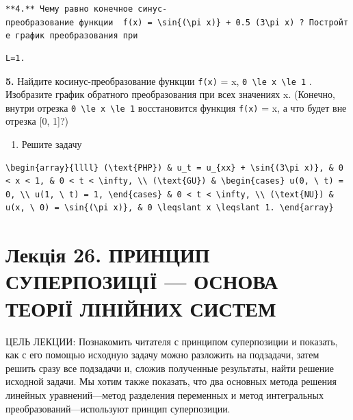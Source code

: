 \documentclass[
  ukrainian,
]{article}
\providecommand{\tightlist}{%
  \setlength{\itemsep}{0pt}\setlength{\parskip}{0pt}}
\begin{document}
\texttt{**4.**\ Чему\ равно\ конечное\ синус-преобразование\ функции\ \ \textquotesingle{}f(x)\ =\ \textbackslash{}sin\{(\textbackslash{}pi\ x)\}\ +\ 0.5\ (3\textbackslash{}pi\ x)\textquotesingle{}\ ?\ Постройте\ график\ преобразования\ при}

\begin{verbatim}
L=1.
\end{verbatim}

\textbf{5.} Найдите косинус-преобразование функции \texttt{f(x)} = x,
\texttt{0\ \textbackslash{}le\ x\ \textbackslash{}le\ 1} . Изобразите
график обратного преобразования при всех значениях x. (Конечно, внутри
отрезка \texttt{0\ \textbackslash{}le\ x\ \textbackslash{}le\ 1}
восстановится функция \texttt{f(x)} = x, а что будет вне отрезка {[}0,
1{]}?)

\begin{enumerate}
\def\labelenumi{\arabic{enumi}.}
\setcounter{enumi}{5}
\tightlist
\item
  Решите задачу
\end{enumerate}

\begin{verbatim}
\begin{array}{llll} (\text{PHP}) & u_t = u_{xx} + \sin{(3\pi x)}, & 0 < x < 1, & 0 < t < \infty, \\ (\text{GU}) & \begin{cases} u(0, \ t) = 0, \\ u(1, \ t) = 1, \end{cases} & 0 < t < \infty, \\ (\text{NU}) & u(x, \ 0) = \sin{(\pi x)}, & 0 \leqslant x \leqslant 1. \end{array}
\end{verbatim}

\section{Лекція 26. ПРИНЦИП СУПЕРПОЗИЦІЇ --- ОСНОВА ТЕОРІЇ ЛІНІЙНИХ
СИСТЕМ}\label{ux43bux435ux43aux446ux456ux44f-26.-ux43fux440ux438ux43dux446ux438ux43f-ux441ux443ux43fux435ux440ux43fux43eux437ux438ux446ux456ux457-ux43eux441ux43dux43eux432ux430-ux442ux435ux43eux440ux456ux457-ux43bux456ux43dux456ux439ux43dux438ux445-ux441ux438ux441ux442ux435ux43c}

ЦЕЛЬ ЛЕКЦИИ: Познакомить читателя с принципом суперпозиции и показать,
как с его помощью исходную задачу можно разложить на подзадачи, затем
решить сразу все подзадачи и, сложив полученные результаты, найти
решение исходной задачи. Мы хотим также показать, что два основных
метода решения линейных уравнений---метод разделения переменных и метод
интегральных преобразований---используют принцип суперпозиции.
\end{document}
